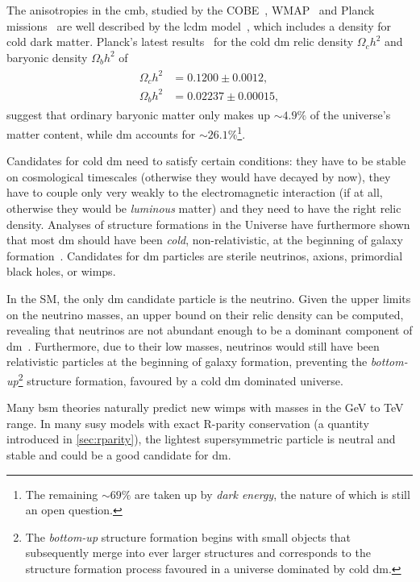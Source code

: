 The anisotropies in the \gls{cmb}, studied by the COBE~\cite{Bennett:1996ce,COBE}, WMAP~\cite{WMAP2,WMAP1} and Planck missions~\cite{Planck} are well described by the \gls{lcdm} model~\cite{Liddle:1976476}, which includes a density for cold dark matter. Planck's latest results~\cite{Aghanim:2018eyx} for the cold \gls{dm} relic density $\Omega_c h^2$ and baryonic density $\Omega_b h^2$ of
\begin{align}
\begin{split}
	\Omega_c h^2 &= 0.1200\pm0.0012, \\
	\Omega_b h^2 &= 0.02237\pm0.00015,
\end{split}
\end{align}
suggest that ordinary baryonic matter only makes up $\sim 4.9\%$ of the universe's matter content, while \gls{dm} accounts for $\sim 26.1\%$\footnote{The remaining $\sim 69\%$ are taken up by \textit{dark energy}, the nature of which is still an open question.}.

Candidates for cold \gls{dm} need to satisfy certain conditions: they have to be stable on cosmological timescales (otherwise they would have decayed by now), they have to couple only very weakly to the electromagnetic interaction (if at all, otherwise they would be \textit{luminous} matter) and they need to have the right relic density. Analyses of structure formations in the Universe have furthermore shown that most \gls{dm} should have been \textit{cold}, \ie non-relativistic, at the beginning of galaxy formation~\cite{Bertone:2004pz}. Candidates for \gls{dm} particles are \eg sterile neutrinos, axions, primordial black holes, or \glspl{wimp}.

In the SM, the only \gls{dm} candidate particle is the neutrino. Given the upper limits on the neutrino masses, an upper bound on their relic density can be computed, revealing that neutrinos are not abundant enough to be a dominant component of \gls{dm}~\cite{Bertone:2004pz}. Furthermore, due to their low masses, neutrinos would still have been relativistic particles at the beginning of galaxy formation, preventing the \textit{bottom-up}\footnote{The \textit{bottom-up} structure formation begins with small objects that subsequently merge into ever larger structures and corresponds to the structure formation process favoured in a universe dominated by cold \gls{dm}.} structure formation, favoured by a cold \gls{dm} dominated universe.

 Many \gls{bsm} theories naturally predict new \glspl{wimp} with masses in the GeV to TeV range. In many \gls{susy} models with exact R-parity conservation (a quantity introduced in \cref{sec:rparity}), the lightest supersymmetric particle is neutral and stable and could be a good candidate for \gls{dm}.

